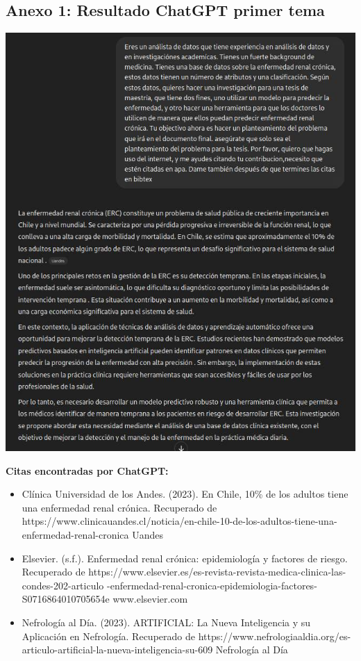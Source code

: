 \documentclass{article}
\begin{document}
\subsection{Anexo 1: Resultado ChatGPT primer tema}
\begin{center}
    \includegraphics[width=\textwidth]{../gpt2.jpg}
\end{center}
\textbf{Citas encontradas por ChatGPT:}
\begin{itemize}
    \item Clínica Universidad de los Andes. (2023). En Chile, 10\% de los adultos tiene una enfermedad renal crónica. Recuperado de https://www.clinicauandes.cl/noticia/en-chile-10-de-los-adultos-tiene-una-enfermedad-renal-cronica
        Uandes
    \item Elsevier. (s.f.). Enfermedad renal crónica:
        epidemiología y factores de riesgo. Recuperado de
    https://www.elsevier.es/es-revista-revista-medica-clinica-las-condes-202-articulo
    -enfermedad-renal-cronica-epidemiologia-factores-S0716864010705654e
        www.elsevier.com
    \item Nefrología al Día. (2023). ARTIFICIAL: La Nueva Inteligencia y su Aplicación en Nefrología. Recuperado de https://www.nefrologiaaldia.org/es-articulo-artificial-la-nueva-inteligencia-su-609
Nefrología al Día
\end{itemize}
\newpage
\end{document}
